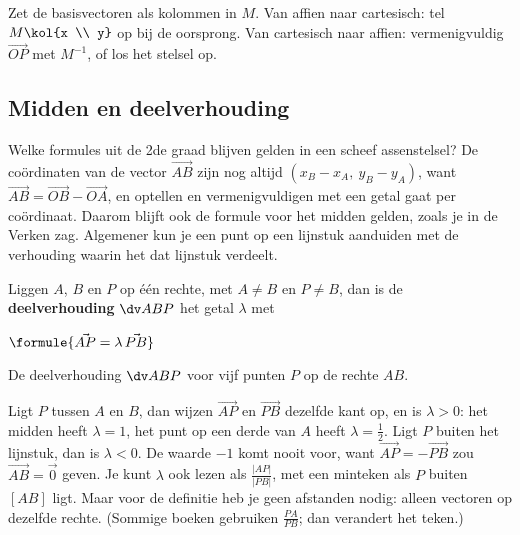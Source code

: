 \begin{werkwijze}
Zet de basisvectoren als kolommen in $M$. Van affien naar cartesisch: tel $M\kol{x \\ y}$ op bij de oorsprong. Van cartesisch naar affien: vermenigvuldig $\vec{OP}$ met $M^{-1}$, of los het stelsel op.
\end{werkwijze}


\begin{oefeningen}
\end{oefeningen}

\subsection{Midden en deelverhouding}

Welke formules uit de 2de graad blijven gelden in een scheef assenstelsel? De coördinaten van de vector $\vec{AB}$ zijn nog altijd $(x_B - x_A,\ y_B - y_A)$, want $\vec{AB} = \vec{OB} - \vec{OA}$, en optellen en vermenigvuldigen met een getal gaat per coördinaat. Daarom blijft ook de formule voor het midden gelden, zoals je in de Verken zag. Algemener kun je een punt op een lijnstuk aanduiden met de verhouding waarin het dat lijnstuk verdeelt.

\begin{theorie}
Liggen $A$, $B$ en $P$ op één rechte, met $A \neq B$ en $P \neq B$, dan is de \textbf{\textcolor{accent}{deelverhouding}} $\dv ABP$ het getal $\lambda$ met

\vspace{1mm}
\qquad $\formule{\vec{AP} = \lambda\,\vec{PB}}$
\end{theorie}

\begin{center}\small De deelverhouding $\dv ABP$ voor vijf punten $P$ op de rechte $AB$.\end{center}

Ligt $P$ tussen $A$ en $B$, dan wijzen $\vec{AP}$ en $\vec{PB}$ dezelfde kant op, en is $\lambda > 0$: het midden heeft $\lambda = 1$, het punt op een derde van $A$ heeft $\lambda = \tfrac12$. Ligt $P$ buiten het lijnstuk, dan is $\lambda < 0$. De waarde $-1$ komt nooit voor, want $\vec{AP} = -\vec{PB}$ zou $\vec{AB} = \vec 0$ geven. Je kunt $\lambda$ ook lezen als $\tfrac{|AP|}{|PB|}$, met een minteken als $P$ buiten $[AB]$ ligt. Maar voor de definitie heb je geen afstanden nodig: alleen vectoren op dezelfde rechte. (Sommige boeken gebruiken $\tfrac{PA}{PB}$; dan verandert het teken.)

